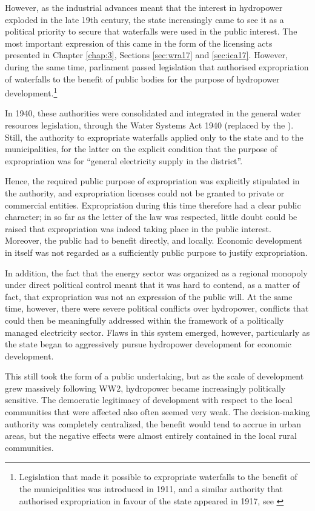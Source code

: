 However, as the industrial advances meant that the interest in hydropower exploded in the late 19th century, the state increasingly came to see it as a political priority to secure that waterfalls were used in the public interest. The most important expression of this came in the form of the licensing acts presented in Chapter \ref{chap:3}, Sections \ref{sec:wra17} and \ref{sec:ica17}. However, during the same time, parliament passed legislation that authorised expropriation of waterfalls to the benefit of public bodies for the purpose of hydropower development.\footnote{Legislation that made it possible to expropriate waterfalls to the benefit of the municipalities was introduced in 1911, and a similar authority that authorised expropriation in favour of the state appeared in 1917, see \cite[29]{amundsen..}}

In 1940, these authorities were consolidated and integrated in the general water resources legislation, through the Water Systems Act 1940 (replaced by the \cite{wra00}). Still, the authority to expropriate waterfalls applied only to the state and to the municipalities, for the latter on the explicit condition that the purpose of expropriation was for ``general electricity supply in the district''. 

Hence, the required public purpose of expropriation was explicitly stipulated in the authority, and expropriation licenses could not be granted to private or commercial entities. Expropriation during this time therefore had a clear public character; in so far as the letter of the law was respected, little doubt could be raised that expropriation was indeed taking place in the public interest. Moreover, the public had to benefit directly, and locally. Economic development in itself was not regarded as a sufficiently public purpose to justify expropriation.

In addition, the fact that the energy sector was organized as a regional monopoly under direct political control meant that it was hard to contend, as a matter of fact, that expropriation was not an expression of the public will. At the same time, however, there were severe political conflicts over hydropower, conflicts that could then be meaningfully addressed within the framework of a politically managed electricity sector. Flaws in this system emerged, however, particularly as the state began to aggressively pursue hydropower development for economic development. 

This still took the form of a public undertaking, but as the scale of development grew massively following WW2, hydropower became increasingly politically sensitive. The democratic legitimacy of development with respect to the local communities that were affected also often seemed very weak. The decision-making authority was completely centralized, the benefit would tend to accrue in urban areas, but the negative effects were almost entirely contained in the local rural communities.

